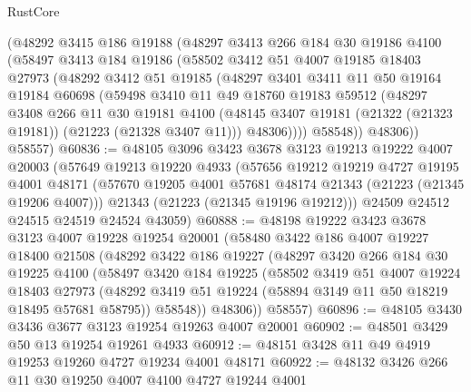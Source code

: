 \begin{lexlean}{RustCore}
\begin{coremodule}
      (@48292
        @3415
        @186
        @19188
        (@48297
          @3413
          @266
          @184
          @30
          @19186
          @4100
          (@58497
            @3413
            @184
            @19186
            (@58502
              @3412
              @51
              @4007
              @19185
              @18403
              @27973
              (@48292
                @3412
                @51
                @19185
                (@48297
                  @3401
                  @3411
                  @11
                  @50
                  @19164
                  @19184
                  @60698
                  (@59498
                    @3410
                    @11
                    @49
                    @18760
                    @19183
                    @59512
                    (@48297
                      @3408
                      @266
                      @11
                      @30
                      @19181
                      @4100
                      (@48145 @3407 @19181 (@21322 (@21323 @19181)) (@21223 (@21328 @3407 @11)))
                      @48306))))
              @58548))
          @48306))
      @58557)
@60836 := @48105
    @3096
    @3423
    @3678
    @3123
    @19213
    @19222
    @4007
    @20003
    (@57649
      @19213
      @19220
      @4933
      (@57656
        @19212
        @19219
        @4727
        @19195
        @4001
        @48171
        (@57670 @19205 @4001 @57681 @48174 @21343 (@21223 (@21345 @19206 @4007)))
        @21343
        (@21223 (@21345 @19196 @19212)))
      @24509
      @24512
      @24515
      @24519
      @24524
      @43059)
@60888 := @48198
    @19222
    @3423
    @3678
    @3123
    @4007
    @19228
    @19254
    @20001
    (@58480
      @3422
      @186
      @4007
      @19227
      @18400
      @21508
      (@48292
        @3422
        @186
        @19227
        (@48297
          @3420
          @266
          @184
          @30
          @19225
          @4100
          (@58497
            @3420
            @184
            @19225
            (@58502
              @3419
              @51
              @4007
              @19224
              @18403
              @27973
              (@48292 @3419 @51 @19224 (@58894 @3149 @11 @50 @18219 @18495 @57681 @58795))
              @58548))
          @48306))
      @58557)
@60896 := @48105 @3430 @3436 @3677 @3123 @19254 @19263 @4007 @20001
@60902 := @48501 @3429 @50 @13 @19254 @19261 @4933
@60912 := @48151 @3428 @11 @49 @4919 @19253 @19260 @4727 @19234 @4001 @48171
@60922 := @48132 @3426 @266 @11 @30 @19250 @4007 @4100 @4727 @19244 @4001

\end{coremodule}
\end{lexlean}
